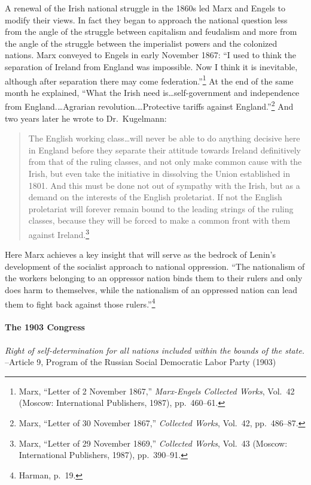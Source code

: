 A renewal of the Irish national struggle in the 1860s led Marx and Engels to modify their views. In fact they began to approach the national question less from the angle of the struggle between capitalism and feudalism and more from the angle of the struggle between the imperialist powers and the colonized nations. Marx conveyed to Engels in early November 1867: ``I used to think the separation of Ireland from England was impossible. Now I think it is inevitable, although after separation there may come federation.''\footnote{Marx, ``Letter of 2 November 1867,'' \emph{Marx-Engels Collected Works}, Vol.\ 42 (Moscow: International Publishers, 1987), pp.\ 460--61.} At the end of the same month he explained, ``What the Irish need is\ldots self-government and independence from England.\ldots Agrarian revolution.\ldots Protective tariffs against England.''\footnote{Marx, ``Letter of 30 November 1867,'' \emph{Collected Works}, Vol.\ 42, pp.\ 486--87.} And two years later he wrote to Dr.\ Kugelmann:

\blockquote{The English working class\ldots will never be able to do anything decisive here in England before they separate their attitude towards Ireland definitively from that of the ruling classes, and not only make common cause with the Irish, but even take the initiative in dissolving the Union established in 1801. And this must be done not out of sympathy with the Irish, but as a demand on the interests of the English proletariat. If not the English proletariat will forever remain bound to the leading strings of the ruling classes, because they will be forced to make a common front with them against Ireland.\footnote{Marx, ``Letter of 29 November 1869,'' \emph{Collected Works}, Vol.\ 43 (Moscow: International Publishers, 1987), pp.\ 390--91.}}

Here Marx achieves a key insight that will serve as the bedrock of Lenin's development of the socialist approach to national oppression. ``The nationalism of the workers belonging to an oppressor nation binds them to their rulers and only does harm to themselves, while the nationalism of an oppressed nation can lead them to fight back against those rulers.''\footnote{Harman, p.\ 19.}

\paragraph{The 1903 Congress}

\begin{flushleft}\emph{Right of self-determination for all nations included within the bounds of the state.}\\
--Article 9, Program of the Russian Social Democratic Labor Party (1903)
\end{flushleft}

